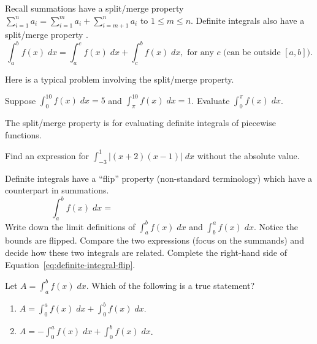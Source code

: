 \documentclass[../main.tex]{subfiles}
\begin{document}
Recall summations have a split/merge property \(\sum_{i=1}^{n} a_{i} = \sum_{i=1}^{m} a_{i} + \sum_{i=m+1}^{n} a_{i}\)  to \(1 \le m \le n\).
Definite integrals also have a split/merge property .
\begin{equation} \label{eq:definite-integral-split}
  \int_{a}^{b} f(x) \;dx = \int_{a}^{c} f(x) \;dx + \int_{c}^{b} f(x) \;dx, \text{ for any } c \text{ (can be outside \([a,b]\)}).
\end{equation}


Here is a typical problem involving the split/merge property.
\begin{example} \label{ex:definite-integral-split}
  Suppose \(\int_{0}^{10} f(x) \;dx = 5\) and \(\int_{\pi}^{10} f(x) \;dx = 1\).  Evaluate \(\int_{0}^{\pi} f(x) \;dx\).

\end{example}

The split/merge property is  for evaluating definite integrals of piecewise functions.
\begin{example}
  Find an expression for \(\int_{-3}^{1} |(x+2)(x-1)| \;dx \) without the absolute value. 

\end{example}
\vfill{}\clearpage

Definite integrals have a ``flip'' property (non-standard terminology) which  have a counterpart in summations.
\begin{equation} \label{eq:definite-integral-flip}
  \int_{a}^{b} f(x) \;dx = \hspace{3in}
\end{equation}
Write down the limit definitions of \(\int_{a}^{b} f(x) \;dx\) and \(\int_{b}^{a} f(x) \;dx\). Notice the bounds are flipped.
Compare the two expressions (focus on the summands) and decide how these two integrals are related. Complete the right-hand side of Equation~\eqref{eq:definite-integral-flip}.


\begin{example}
  Let \(A = \int_{a}^{b} f(x) \;dx\). Which of the following is a true statement?
  \begin{enumerate}[label=(\alph*)]
    \item \(A = \int_{0}^{a} f(x) \;dx + \int_{0}^{b} f(x) \;dx\).
    \item \(A = - \int_{0}^{a} f(x) \;dx + \int_{0}^{b} f(x) \;dx\).
  \end{enumerate}

\end{example}
\end{document}
